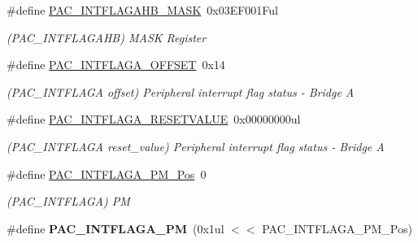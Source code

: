 \begin{DoxyCompactItemize}
\item 
\hypertarget{group___s_a_m_l21___p_a_c_gade378cf78980d5a5047a176b8fe09375}{}\#define \hyperlink{group___s_a_m_l21___p_a_c_gade378cf78980d5a5047a176b8fe09375}{P\+A\+C\+\_\+\+I\+N\+T\+F\+L\+A\+G\+A\+H\+B\+\_\+\+M\+A\+S\+K}~0x03\+E\+F001\+Ful\label{group___s_a_m_l21___p_a_c_gade378cf78980d5a5047a176b8fe09375}

\begin{DoxyCompactList}\small\item\em (P\+A\+C\+\_\+\+I\+N\+T\+F\+L\+A\+G\+A\+H\+B) M\+A\+S\+K Register \end{DoxyCompactList}\item 
\hypertarget{group___s_a_m_l21___p_a_c_ga60a473e4010e9cf3199b82139414f8c1}{}\#define \hyperlink{group___s_a_m_l21___p_a_c_ga60a473e4010e9cf3199b82139414f8c1}{P\+A\+C\+\_\+\+I\+N\+T\+F\+L\+A\+G\+A\+\_\+\+O\+F\+F\+S\+E\+T}~0x14\label{group___s_a_m_l21___p_a_c_ga60a473e4010e9cf3199b82139414f8c1}

\begin{DoxyCompactList}\small\item\em (P\+A\+C\+\_\+\+I\+N\+T\+F\+L\+A\+G\+A offset) Peripheral interrupt flag status -\/ Bridge A \end{DoxyCompactList}\item 
\hypertarget{group___s_a_m_l21___p_a_c_gac48baf8aa4b8fb392e030088d32fca07}{}\#define \hyperlink{group___s_a_m_l21___p_a_c_gac48baf8aa4b8fb392e030088d32fca07}{P\+A\+C\+\_\+\+I\+N\+T\+F\+L\+A\+G\+A\+\_\+\+R\+E\+S\+E\+T\+V\+A\+L\+U\+E}~0x00000000ul\label{group___s_a_m_l21___p_a_c_gac48baf8aa4b8fb392e030088d32fca07}

\begin{DoxyCompactList}\small\item\em (P\+A\+C\+\_\+\+I\+N\+T\+F\+L\+A\+G\+A reset\+\_\+value) Peripheral interrupt flag status -\/ Bridge A \end{DoxyCompactList}\item 
\hypertarget{group___s_a_m_l21___p_a_c_gadd3a4639c92a89f74a0bfb8f1e5e4447}{}\#define \hyperlink{group___s_a_m_l21___p_a_c_gadd3a4639c92a89f74a0bfb8f1e5e4447}{P\+A\+C\+\_\+\+I\+N\+T\+F\+L\+A\+G\+A\+\_\+\+P\+M\+\_\+\+Pos}~0\label{group___s_a_m_l21___p_a_c_gadd3a4639c92a89f74a0bfb8f1e5e4447}

\begin{DoxyCompactList}\small\item\em (P\+A\+C\+\_\+\+I\+N\+T\+F\+L\+A\+G\+A) P\+M \end{DoxyCompactList}\item 
\hypertarget{group___s_a_m_l21___p_a_c_gae8105eaff95c65f0abda00eb4544a6c3}{}\#define {\bfseries P\+A\+C\+\_\+\+I\+N\+T\+F\+L\+A\+G\+A\+\_\+\+P\+M}~(0x1ul $<$$<$ P\+A\+C\+\_\+\+I\+N\+T\+F\+L\+A\+G\+A\+\_\+\+P\+M\+\_\+\+Pos)\label{group___s_a_m_l21___p_a_c_gae8105eaff95c65f0abda00eb4544a6c3}


\end{DoxyCompactItemize}
